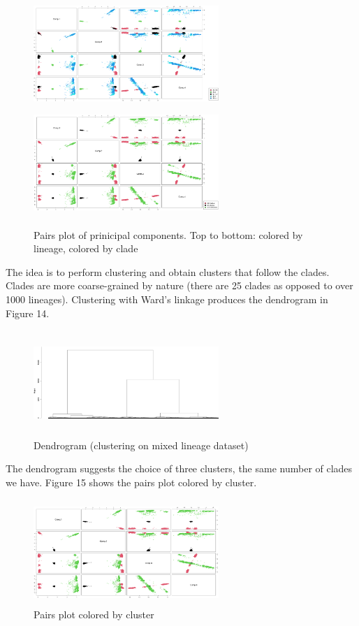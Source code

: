 \documentclass[twoside,twocolumn]{article}
\begin{document}
\begin{figure}[h]
	\caption{Pairs plot of prinicipal components. Top to bottom: colored by lineage, colored by clade}
	\label{pairsx}
	\centering
	\includegraphics[width=70mm, height=40mm]{pairsx.png}
	\includegraphics[width=70mm, height=40mm]{pairsx2.png}
\end{figure}
The idea is to perform clustering and obtain clusters that follow the clades. Clades are more coarse-grained by nature (there are 25 clades as opposed to over 1000 lineages). Clustering with Ward's linkage produces the dendrogram in Figure 14.
\begin{figure}[h]
	\caption{Dendrogram (clustering on mixed lineage dataset)}
	\label{ward2}
	\centering
	\includegraphics[width=70mm, height=40mm]{ward.png}
\end{figure}
The dendrogram suggests the choice of three clusters, the same number of clades we have. Figure 15 shows the pairs plot colored by cluster.
\begin{figure}[h]
	\caption{Pairs plot colored by cluster}
	\label{pairs3}
	\centering
	\includegraphics[width=70mm, height=40mm]{pairs3.png}
\end{figure}
\end{document}
